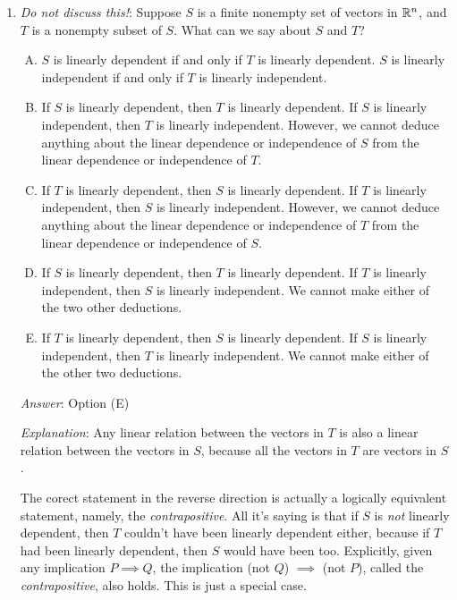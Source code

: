 \documentclass[10pt]{amsart}
\begin{document}
\begin{enumerate}
\item {\em Do not discuss this!}: Suppose $S$ is a finite nonempty set
  of vectors in $\mathbb{R}^n$, and $T$ is a nonempty subset of $S$. What can
  we say about $S$ and $T$?

  \begin{enumerate}[(A)]
  \item $S$ is linearly dependent if and only if $T$ is linearly
    dependent. $S$ is linearly independent if and only if $T$ is
    linearly independent.
  \item If $S$ is linearly dependent, then $T$ is linearly
    dependent. If $S$ is linearly independent, then $T$ is linearly
    independent. However, we cannot deduce anything about the linear
    dependence or independence of $S$ from the linear dependence or
    independence of $T$.
  \item If $T$ is linearly dependent, then $S$ is linearly
    dependent. If $T$ is linearly independent, then $S$ is linearly
    independent. However, we cannot deduce anything about the linear
    dependence or independence of $T$ from the linear dependence or
    independence of $S$.
  \item If $S$ is linearly dependent, then $T$ is linearly
    dependent. If $T$ is linearly independent, then $S$ is linearly
    independent. We cannot make either of the two other deductions.
  \item If $T$ is linearly dependent, then $S$ is linearly
    dependent. If $S$ is linearly independent, then $T$ is linearly
    independent. We cannot make either of the other two deductions.
  \end{enumerate}
    
  {\em Answer}: Option (E)

  {\em Explanation}: Any linear relation between the vectors in $T$ is
  also a linear relation between the vectors in $S$, because all the
  vectors in $T$ are vectors in $S$.

  The corect statement in the reverse direction is actually a
  logically equivalent statement, namely, the {\em
    contrapositive}. All it's saying is that if $S$ is {\em not}
  linearly dependent, then $T$ couldn't have been linearly dependent
  either, because if $T$ had been linearly dependent, then $S$ would
  have been too. Explicitly, given any implication $P \implies Q$, the
  implication (not $Q$) $\implies$ (not $P$), called the {\em
    contrapositive}, also holds. This is just a special case.


\end{enumerate}
\end{document}

